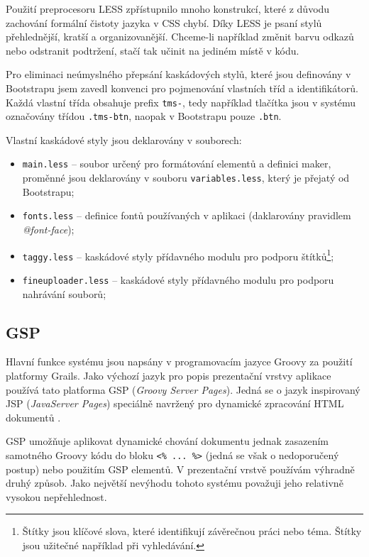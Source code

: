 Použití preprocesoru LESS zpřístupnilo mnoho konstrukcí, které z důvodu zachování formální čistoty jazyka v CSS chybí. Díky LESS je psaní stylů přehlednější, kratší a organizovanější. Chceme-li například změnit barvu odkazů nebo odstranit podtržení, stačí tak učinit na jediném místě v kódu.

Pro eliminaci neúmyslného přepsání kaskádových stylů, které jsou definovány v Bootstrapu jsem zavedl konvenci pro pojmenování vlastních tříd a identifikátorů. Každá vlastní třída obsahuje prefix \texttt{tms-}, tedy například tlačítka jsou v systému označovány třídou \texttt{.tms-btn}, naopak v Bootstrapu pouze \texttt{.btn}.

Vlastní kaskádové styly jsou deklarovány v souborech:

\begin{itemize}
    \item \texttt{main.less} -- soubor určený pro formátování elementů a definici maker, proměnné jsou deklarovány v souboru \texttt{variables.less}, který je přejatý od Bootstrapu;
    \item \texttt{fonts.less} -- definice fontů používaných v aplikaci (daklarovány pravidlem \textit{@font-face});
    \item \texttt{taggy.less} -- kaskádové styly přídavného modulu pro podporu štítků\footnote{Štítky jsou klíčové slova, které identifikují závěrečnou práci nebo téma. Štítky jsou užitečné například při vyhledávání.};
    \item \texttt{fineuploader.less} -- kaskádové styly přídavného modulu pro podporu nahrávání souborů;
\end{itemize}

\subsection{GSP}
\label{subsec:gsp}

Hlavní funkce systému jsou napsány v programovacím jazyce Groovy za použití platformy Grails. Jako výchozí jazyk pro popis prezentační vrstvy aplikace používá tato platforma GSP (\textit{Groovy Server Pages}). Jedná se o jazyk inspirovaný JSP (\textit{JavaServer Pages}) speciálně navržený pro dynamické zpracování HTML dokumentů \cite{20}.

GSP umožňuje aplikovat dynamické chování dokumentu jednak zasazením samotného Groovy kódu do bloku \texttt{<\% ... \%>} (jedná se však o nedoporučený postup) nebo použitím GSP elementů. V prezentační vrstvě používám výhradně druhý způsob. Jako největší nevýhodu tohoto systému považuji jeho relativně vysokou nepřehlednost.

